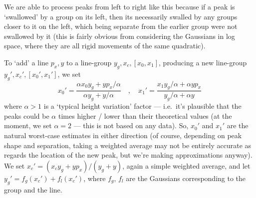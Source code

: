 We are able to process peaks from left to right like this because if
a peak is `swallowed' by a group on its left, then its necessarily
swalled by any groups closer to it on the left, which being separate
from the earlier group were not swallowed by it (this is fairly obvious
from considering the Gaussians in log space, where they are all rigid
movements of the same quadratic).


To `add' a line $p_x, y$ to a line-group $y_g, x_c, [x_0, x_1]$, producing
a new line-group $y_g', x_c', [x_0', x_1']$, we set
\[
x_0' = \frac{\alpha x_0 y_g + y p_x / \alpha}{\alpha y_g + y/\alpha}
\quad , \quad
x_1' = \frac{x_1 y_g/\alpha + \alpha y p_x}{y_g/\alpha +\alpha y}
\]
where $\alpha > 1$ is a `typical height variation' factor --- i.e.\ it's
plausible that the peaks could be $\alpha$ times higher / lower than
their theoretical values (at the moment, we set $\alpha = 2$ --- this is
not based on any data). So, $x_0'$ and $x_1'$ are the natural worst-case
estimates in either direction (of course, depending on peak shape and separation,
taking a weighted average may not be entirely accurate as regards the location
of the new peak, but we're making approximations anyway).
We set $x_c' = (x_c y_g + y p_x)/(y_g + y)$, again a simple weighted average,
and let $y_g' = f_g (x_c') + f_l (x_c')$, where $f_g$, $f_l$ are the Gaussians
corresponding to the group and the line.


